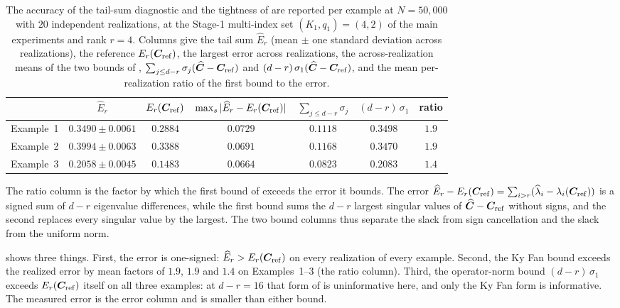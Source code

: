 \documentclass[supplement,review,hidelinks,onefignum,onetabnum]{siamart251216}
\newcommand{\mC}{\bm{C}}
\newcommand{\hmC}{\widehat{\bm{C}}}
\begin{document}
\begin{table}[h]
\centering\small
\setlength{\tabcolsep}{3pt}
\caption{The accuracy of the tail-sum diagnostic and the tightness of  are reported per example at $N = 50{,}000$ with $20$ independent realizations, at the Stage-1 multi-index set $(K_1,q_1) = (4,2)$ of the main experiments and rank $r = 4$. Columns give the tail sum $\widehat E_r$ (mean $\pm$ one standard deviation across realizations), the reference $E_r(\mC_{\rm ref})$, the largest error across realizations, the across-realization means of the two bounds of , $\sum_{j\le d-r}\sigma_j(\hmC-\mC_{\rm ref})$ and $(d-r)\,\sigma_1(\hmC-\mC_{\rm ref})$, and the mean per-realization ratio of the first bound to the error.}
\label{tab:ehat-tightness}
\begin{tabular}{l|cccccc}
\toprule
 & $\widehat E_r$ & $E_r(\mC_{\rm ref})$ & $\max_s|\widehat E_r - E_r(\mC_{\rm ref})|$ & $\sum_{j\le d-r}\sigma_j$ & $(d{-}r)\,\sigma_1$ & ratio \\
\midrule
Example~1 & $0.3490 \pm 0.0061$ & $0.2884$ & $0.0729$ & $0.1118$ & $0.3498$ & $1.9$ \\
Example~2 & $0.3994 \pm 0.0063$ & $0.3388$ & $0.0691$ & $0.1168$ & $0.3470$ & $1.9$ \\
Example~3 & $0.2058 \pm 0.0045$ & $0.1483$ & $0.0664$ & $0.0823$ & $0.2083$ & $1.4$ \\
\bottomrule
\end{tabular}
\end{table}

The ratio column is the factor by which the first bound of  exceeds the error it bounds. The error $\widehat E_r - E_r(\mC_{\rm ref}) = \sum_{i>r}(\widehat\lambda_i - \lambda_i(\mC_{\rm ref}))$ is a signed sum of $d-r$ eigenvalue differences, while the first bound sums the $d-r$ largest singular values of $\hmC-\mC_{\rm ref}$ without signs, and the second replaces every singular value by the largest. The two bound columns thus separate the slack from sign cancellation and the slack from the uniform norm.

 shows three things. First, the error is one-signed: $\widehat E_r > E_r(\mC_{\rm ref})$ on every realization of every example. Second, the Ky Fan bound \cite{Bhatia1997} exceeds the realized error by mean factors of $1.9$, $1.9$ and $1.4$ on Examples~1--3 (the ratio column). Third, the operator-norm bound $(d-r)\,\sigma_1$ exceeds $E_r(\mC_{\rm ref})$ itself on all three examples: at $d - r = 16$ that form of  is uninformative here, and only the Ky Fan form is informative. The measured error is the error column and is smaller than either bound.
\end{document}
